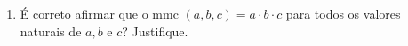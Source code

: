 \documentclass[a4paper,14pt]{article}
\begin{document}
\begin{multicols}{2}
\begin{enumerate}
			\item É correto afirmar que o mmc $(a, b, c) = a \cdot b \cdot c$ para todos os valores naturais de $a, b$ e $c$? Justifique. \\\\\\\\\\\\\\\\\\
		\end{enumerate}
		$~$ \\ $~$ \\ $~$ \\ $~$ \\ $~$ \\ $~$ \\ $~$ \\ $~$ \\ $~$ \\ $~$ \\ $~$ \\ $~$ \\ $~$ \\ $~$ \\ $~$ \\ $~$ \\ $~$ \\ $~$ \\ $~$ \\ $~$ \\ $~$ \\ $~$ \\ $~$ \\ $~$ \\ $~$ \\ $~$ \\ $~$ \\ $~$
	\end{multicols}
\end{document}
